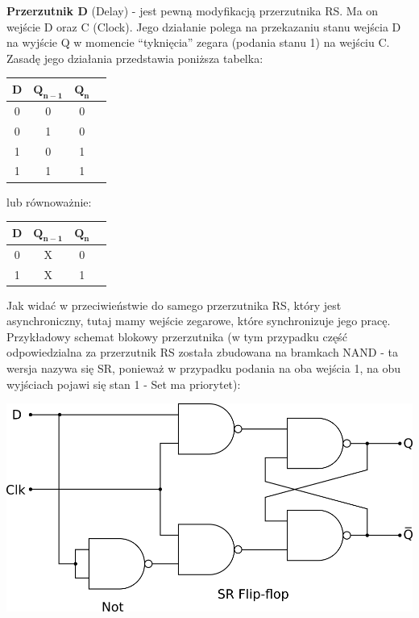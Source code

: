 \documentclass[12pt]{article}
\begin{document}
    
    
    
    \begin{definition}
    	\textbf{Przerzutnik D} (Delay) - jest pewną modyfikacją przerzutnika RS. Ma on wejście D oraz C (Clock). Jego działanie polega na przekazaniu stanu wejścia D na wyjście Q w momencie ``tyknięcia'' zegara
    	(podania stanu 1) na wejściu C.
    	Zasadę jego działania przedstawia poniższa tabelka:
    	\begin{table}[H]
    	\center
	\begin{tabular}{|c|c|c|c|}
	\hline
	\textbf{D} & $\mathbf{Q_{n-1}}$ & $\mathbf{Q_n}$ \\ \hline
	0          & 0                  & 0              \\ \hline
	0          & 1                  & 0              \\ \hline
	1          & 0                  & 1              \\ \hline
	1          & 1                  & 1              \\ \hline
	\end{tabular}
	\end{table}
	
	lub równoważnie:
	
	\begin{table}[H]
    	\center
	\begin{tabular}{|c|c|c|c|}
	\hline
	\textbf{D} & $\mathbf{Q_{n-1}}$ & $\mathbf{Q_n}$ \\ \hline
	0          & X                  & 0              \\ \hline
	1          & X                  & 1              \\ \hline
	\end{tabular}
	\end{table}
	
	Jak widać w przeciwieństwie do samego przerzutnika RS, który jest asynchroniczny, tutaj mamy wejście zegarowe, które synchronizuje jego pracę. \\
	\noindent Przykładowy schemat blokowy przerzutnika (w tym przypadku część odpowiedzialna za przerzutnik RS została zbudowana na bramkach NAND - ta wersja nazywa się SR,
	ponieważ w przypadku podania na oba wejścia 1, na obu wyjściach pojawi się stan 1 - Set ma priorytet): \\
	
	\begin{center}
		\includegraphics[width=0.5\linewidth]{sequentials/d.png}
	\end{center}
	
    \end{definition}
    
\end{document}
